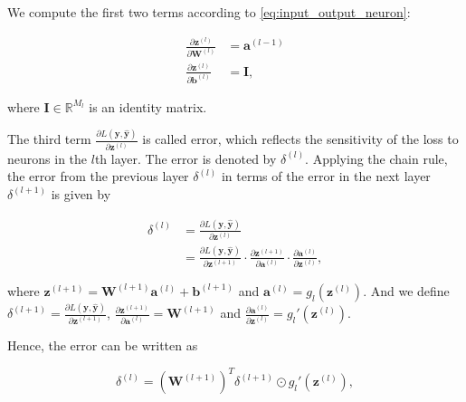 \documentclass[
	parskip, 			   %
	twoside, 			   %
	DIV=14, 			   %
	BCOR=15.0mm, 		   %
	headsepline, 		   %
	open=right, 		   %
	captions=tableheading, %
	bibliography=totoc,    %
	numbers=noenddot       %
]{scrreprt}
\begin{document}
We compute the first two terms according to \ref{eq:input_output_neuron}:

\begin{equation}
    \label{eq:two_terms}
    \begin{aligned}
        \frac{\partial \mathbf{z}^{(l)}}{\partial \mathbf{W}^{(l)}} &= \mathbf{a}^{(l-1)}
        \\
        \frac{\partial \mathbf{z}^{(l)}}{\partial \mathbf{b}^{(l)}} &= \mathbf{I},
    \end{aligned}
\end{equation}

where $\mathbf{I} \in \mathbb{R}^{M_{l}}$ is an identity matrix. 

The third term $\frac{\partial L \left( \mathbf{y}, \hat{\mathbf{y}} \right)}{\partial \mathbf{z}^{(l)}}$ is called error, which reflects the sensitivity of the loss to neurons in the $l$th layer. The error is denoted by $\delta^{(l)}$. Applying the chain rule, the error from the previous layer $\delta^{(l)}$ in terms of the error in the next layer $\delta^{(l+1)}$ is given by

\begin{equation}
    \label{eq:error_in_one_layer}
    \begin{aligned}
        \delta^{(l)} &= \frac{\partial L \left( \mathbf{y}, \hat{\mathbf{y}} \right)}{\partial \mathbf{z}^{(l)}}
        \\
        &= \frac{\partial L \left( \mathbf{y}, \hat{\mathbf{y}} \right)}{\partial \mathbf{z}^{(l+1)}} \cdot \frac{\partial \mathbf{z}^{(l+1)}}{\partial \mathbf{a}^{(l)}} \cdot \frac{\partial \mathbf{a}^{(l)}}{\partial \mathbf{z}^{(l)}},
    \end{aligned}
\end{equation}

where $\mathbf{z}^{(l+1)} = \mathbf{W}^{(l+1)} \mathbf{a}^{(l)} + \mathbf{b}^{(l+1)}$ and $\mathbf{a}^{(l)} = g_{l}(\mathbf{z}^{(l)})$. And we define $\delta^{(l+1)}=\frac{\partial L \left( \mathbf{y}, \hat{\mathbf{y}} \right)}{\partial \mathbf{z}^{(l+1)}}$, $\frac{\partial \mathbf{z}^{(l+1)}}{\partial \mathbf{a}^{(l)}} = \mathbf{W}^{(l+1)}$ and $\frac{\partial \mathbf{a}^{(l)}}{\partial \mathbf{z}^{(l)}} = g_{l}'(\mathbf{z}^{(l)})$.

Hence, the error can be written as

\begin{equation}
    \label{eq:error_in_one_line}
        \delta^{(l)} = (\mathbf{W}^{(l+1)})^T \delta^{(l+1)} \odot g_{l}'(\mathbf{z}^{(l)}),
\end{equation}
\end{document}

